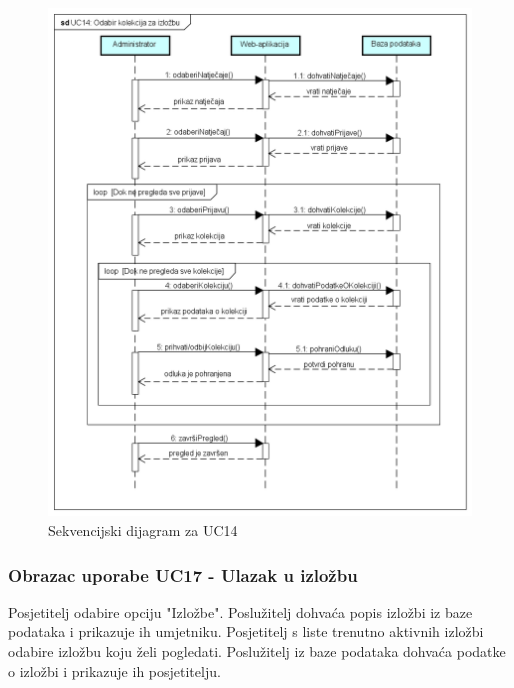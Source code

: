 		\begin{figure}[H]
			
			\includegraphics[width=\textwidth,height=\textheight,keepaspectratio]{sd_uc14}
			\caption{Sekvencijski dijagram za UC14}
			
		\end{figure}
		\eject
		
		\subsubsection{Obrazac uporabe UC17 - Ulazak u izložbu}
		
		{Posjetitelj odabire opciju "Izložbe". Poslužitelj dohvaća popis izložbi iz baze podataka i prikazuje ih umjetniku.
			Posjetitelj s liste trenutno aktivnih izložbi odabire izložbu koju želi pogledati. Poslužitelj iz baze
			podataka dohvaća podatke o izložbi i prikazuje ih posjetitelju. }
		
